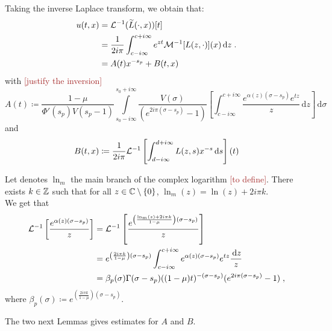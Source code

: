 \documentclass[11pt]{amsart}
\newcommand{\diff}{\,\mathrm{d}}
\newcommand{\ndr}[1]{\textcolor{brown}{[#1]}}
\begin{document}
Taking the inverse Laplace transform, we obtain that: 
\begin{align*}
     u(t,x) &= \Lcal^{-1}(\tilde L(\cdot, x))[t] \\
     &= \frac{1}{2i\pi } \int_{c-i\infty}^{c+i\infty} e^{zt}\Mcal^{-1}[L(z,\cdot)](x) \diff z
     \eqfinp\\
     &= A(t)x^{-s_p} + B(t,x)
\end{align*}
with \ndr{justify the inversion}
\begin{equation}
    A(t) \coloneqq\frac{1-\mu}{\Phi'(s_p) V(s_p-1)}
     \int\limits_{s_0-i\infty}^{s_0+i\infty}
     \frac{V(\sigma)
  }{(e^{2i\pi(\sigma-s_p)}-1)} \left[\int_{c-i\infty}^{c+i\infty} \frac{e^{ \alpha(z)(\sigma-s_p)}e^{tz}}{z}\diff z \right] \diff \sigma
  \label{def:A} 
\end{equation}
and 
\begin{equation}
    B(t,x) \coloneqq \frac{1}{2i\pi} \Lcal^{-1}\left[\int_{d-i\infty}^{d+i\infty} L(z,s)x^{-s}\diff s \right] (t)
\label{def:B}
\end{equation}

Let denotes $\ln_{m}$  the main branch of the complex logarithm \ndr{to define}. There exists $k \in \mathbb{Z}$ such that for all $z \in \mathbb{C} \setminus \{0\}$, $\ln_m(z) = \ln(z) + 2i\pi k. $ \\
We get that 
\begin{subequations}
\begin{align}
    \Lcal^{-1}\left[ \frac{e^{ \alpha(z)(\sigma-s_p)}}{z}  \right]
    &= 
    \Lcal^{-1}\left[ \frac{e^{ \left( \frac{\ln_m(z) + 2i\pi k}{1-\mu} \right) (\sigma-s_p)}}{z}  \right] \\
    &= 
    e^{ \left( \frac{2i\pi k}{1-\mu} \right) (\sigma-s_p)}
    \int_{c-i\infty}^{c+i\infty} e^{ \alpha(z)(\sigma-s_p)}e^{tz}\frac{\diff z}{z}\\
    &= \beta_p(\sigma) \Gamma(\sigma-s_p)((1-\mu)t)^{-(\sigma-s_p)}(e^{2i\pi(\sigma-s_p)}-1)
    \eqfinv
\end{align}
\label{eq:calcLaplInv}
\end{subequations}
where $\beta_p(\sigma) \coloneqq e^{ \left( \frac{2i\pi k}{1-\mu} \right) (\sigma-s_p)}$. 

The two next Lemmas gives estimates for $A$ and $B$. 
\end{document}
